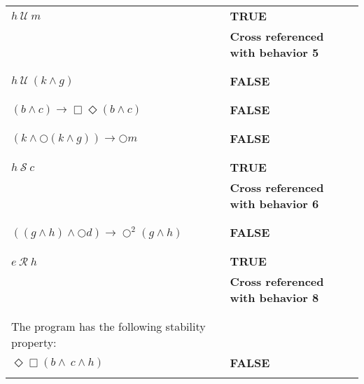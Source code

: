 \documentclass[12pt]{article}
\begin{document}
\begin{enumerate}
\begin{table}
\begin{tabular}{|l|l|}
		
$h ~\mathcal{U}~ m$									 
 &\textbf{TRUE}\\
 &\textbf{Cross referenced with behavior 5}\\
&\\

\hline

&\\
		
$h ~\mathcal{U}~ (k \wedge g)$						
 &\textbf{FALSE}\\

&\\

\hline

&\\
		
$(b \wedge c) \rightarrow \Box \Diamond (b \wedge c)$ 
 &\textbf{FALSE}\\
&\\

\hline

&\\
		
$(k \wedge \bigcirc (k \wedge g)) \rightarrow \bigcirc m$ 
 &\textbf{FALSE}\\
&\\

\hline

&\\
		
$ h ~\mathcal{S}~ c$							
 &\textbf{TRUE}\\
 &\textbf{Cross referenced with behavior 6}\\
&\\

\hline

&\\
		
$ ((g \wedge h) \wedge \bigcirc d) \rightarrow \bigcirc^{2} (g \wedge h)$
 &\textbf{FALSE}\\
&\\

\hline

&\\
		
$e ~\mathcal{R}~ h$								
 &\textbf{TRUE}\\
 &\textbf{Cross referenced with behavior 8}\\
&\\

\hline

&\\
		
The program has the following stability property: &\\
$\Diamond \Box (b \wedge \ c \wedge h)$		
 &\textbf{FALSE}\\
&\\


\end{tabular}
\end{table}
\end{enumerate}
\end{document}
